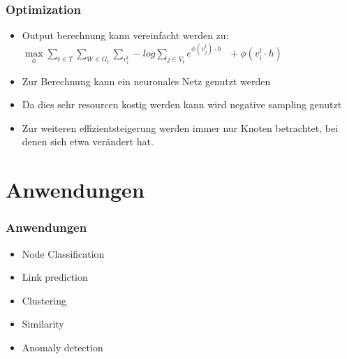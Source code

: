 \documentclass{beamer}
\begin{document}
\begin{frame}
  \frametitle{Optimization}
  \begin{itemize}
    \item Output berechnung kann vereinfacht werden zu:   
    \(\max\limits_\phi \sum\limits_{t \in T}\sum\limits_{W\in G_t}\sum\limits_{v_i^t} -log\sum\limits_{j\in V_t} e^{\phi(v_j^t)\cdot h}\:\:\: +\phi(v_i^t \cdot h)\)
    \item Zur Berechnung kann ein neuronales Netz genutzt werden
    \item Da dies sehr resourcen kostig werden kann wird negative sampling genutzt
    \item Zur weiteren effizientsteigerung werden immer nur Knoten betrachtet, bei denen sich etwa verändert hat.
  \end{itemize}
\end{frame}

\section{Anwendungen}
\begin{frame}
  \frametitle{Anwendungen}
  \begin{itemize}
    \item Node Classification
    \item Link prediction
    \item Clustering
    \item Similarity
    \item Anomaly detection
  \end{itemize}
\end{frame}
\end{document}

